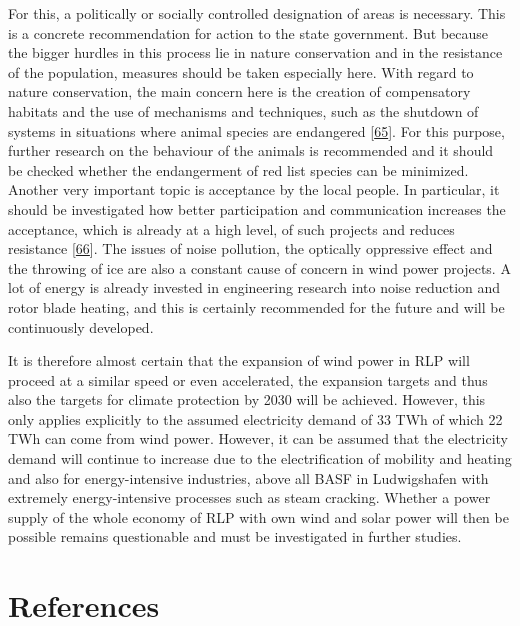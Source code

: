 \documentclass[a4paper,11pt]{article}
\begin{document}
For this, a politically or socially controlled designation of areas is necessary. This is a concrete recommendation for action to the state government. But because the bigger hurdles in this process lie in nature conservation and in the resistance of the population, measures should be taken especially here. With regard to nature conservation, the main concern here is the creation of compensatory habitats and the use of mechanisms and techniques, such as the shutdown of systems in situations where animal species are endangered {[}\protect\hyperlink{ref-BUNDux5cux26Nabu.2017}{65}{]}. For this purpose, further research on the behaviour of the animals is recommended and it should be checked whether the endangerment of red list species can be minimized. Another very important topic is acceptance by the local people. In particular, it should be investigated how better participation and communication increases the acceptance, which is already at a high level, of such projects and reduces resistance {[}\protect\hyperlink{ref-FachagenturWindenergieanLand.2020}{66}{]}. The issues of noise pollution, the optically oppressive effect and the throwing of ice are also a constant cause of concern in wind power projects. A lot of energy is already invested in engineering research into noise reduction and rotor blade heating, and this is certainly recommended for the future and will be continuously developed.

It is therefore almost certain that the expansion of wind power in RLP will proceed at a similar speed or even accelerated, the expansion targets and thus also the targets for climate protection by 2030 will be achieved. However, this only applies explicitly to the assumed electricity demand of 33 TWh of which 22 TWh can come from wind power. However, it can be assumed that the electricity demand will continue to increase due to the electrification of mobility and heating and also for energy-intensive industries, above all BASF in Ludwigshafen with extremely energy-intensive processes such as steam cracking. Whether a power supply of the whole economy of RLP with own wind and solar power will then be possible remains questionable and must be investigated in further studies.

\newpage

\hypertarget{references}{%
\section*{References}\label{references}}
\end{document}
